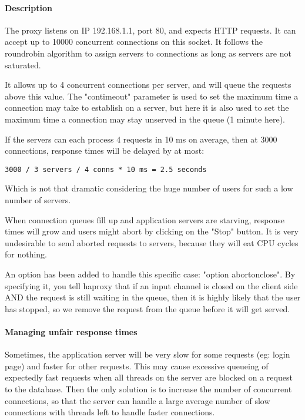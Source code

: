 \paragraph{Description}

The proxy listens on IP 192.168.1.1, port 80, and expects HTTP requests. It
can accept up to 10000 concurrent connections on this socket. It follows the
roundrobin algorithm to assign servers to connections as long as servers are
not saturated.

It allows up to 4 concurrent connections per server, and will queue the
requests above this value. The "contimeout" parameter is used to set the
maximum time a connection may take to establish on a server, but here it
is also used to set the maximum time a connection may stay unserved in the
queue (1 minute here).

If the servers can each process 4 requests in 10 ms on average, then at 3000
connections, response times will be delayed by at most:

   \verb|3000 / 3 servers / 4 conns * 10 ms = 2.5 seconds|

Which is not that dramatic considering the huge number of users for such a low
number of servers.

When connection queues fill up and application servers are starving, response
times will grow and users might abort by clicking on the "Stop" button. It is
very undesirable to send aborted requests to servers, because they will eat
CPU cycles for nothing.

An option has been added to handle this specific case: "option abortonclose".
By specifying it, you tell haproxy that if an input channel is closed on the
client side AND the request is still waiting in the queue, then it is highly
likely that the user has stopped, so we remove the request from the queue
before it will get served.

\paragraph{Managing unfair response times}

Sometimes, the application server will be very slow for some requests (eg:
login page) and faster for other requests. This may cause excessive queueing
of expectedly fast requests when all threads on the server are blocked on a
request to the database. Then the only solution is to increase the number of
concurrent connections, so that the server can handle a large average number
of slow connections with threads left to handle faster connections.

